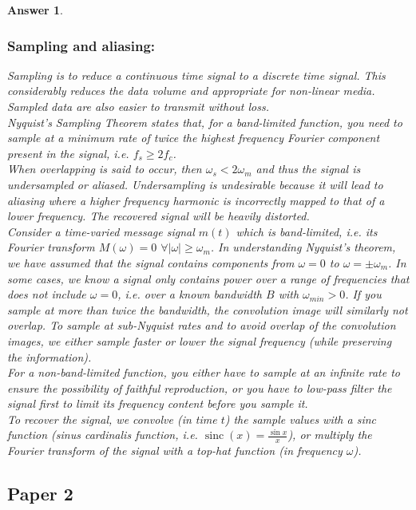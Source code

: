 \documentclass[a4paper]{article}
\DeclareMathOperator{\sinc}{sinc}
\newtheorem{ans}{Answer}[subsection]
\theoremstyle{new}
\begin{document}
\begin{ans}
\subsubsection*{Sampling and aliasing:}
Sampling is to reduce a continuous time signal to a discrete time signal. This considerably reduces the data volume and appropriate for non-linear media. Sampled data are also easier to transmit without loss.\\[5pt]
Nyquist's Sampling Theorem states that, for a band-limited function, you need to sample at a minimum rate of twice the highest frequency Fourier component present in the signal, i.e. $f_s\geq 2f_c$.\\[5pt]
When overlapping is said to occur, then $\omega_s<2\omega_m$ and thus the signal is undersampled or aliased. Undersampling is undesirable because it will lead to aliasing where a higher frequency harmonic is incorrectly mapped to that of a lower frequency. The recovered signal will be heavily distorted.\\[5pt]
Consider a time-varied message signal $m(t)$ which is band-limited, i.e. its Fourier transform $M(\omega)=0$ $\forall|\omega|\geq\omega_m$. In understanding Nyquist's theorem, we have assumed that the signal contains components from $\omega=0$ to $\omega=\pm\omega_m$. In some cases, we know a signal only contains power over a range of frequencies that does not include $\omega=0$, i.e. over a known bandwidth $B$ with $\omega_{min}>0$. If you sample at more than twice the bandwidth, the convolution image will similarly not overlap. To sample at sub-Nyquist rates and to avoid overlap of the convolution images, we either sample faster or lower the signal frequency (while preserving the information).\\[5pt]
For a non-band-limited function, you either have to sample at an infinite rate to ensure the possibility of faithful reproduction, or you have to low-pass filter the signal first to limit its frequency content before you sample it.\\[5pt]
To recover the signal, we convolve (in time $t$) the sample values with a sinc function (sinus cardinalis function, i.e. $\sinc(x)=\frac{\sin x}{x}$), or multiply the Fourier transform of the signal with a top-hat function (in frequency $\omega$).
\end{ans}
\newpage
\subsection{Paper 2}
\end{document}
